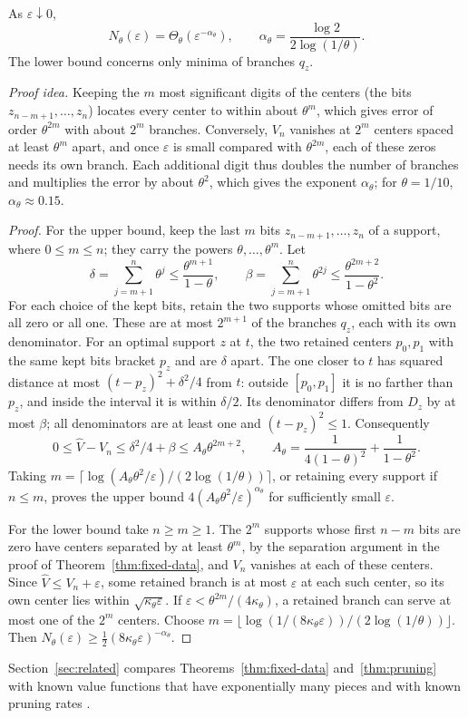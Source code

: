 \begin{theorem}\label{thm:pruning}
As $\varepsilon\downarrow0$,
\[
 N_\theta(\varepsilon)=\Theta_\theta(\varepsilon^{-\alpha_\theta}),
 \qquad \alpha_\theta=\frac{\log2}{2\log(1/\theta)}.
\]
The lower bound concerns only minima of branches $q_z$.
\end{theorem}

\emph{Proof idea.} Keeping the $m$ most significant digits of the
centers (the bits $z_{n-m+1},\ldots,z_n$) locates every center to within
about $\theta^m$, which gives error of order $\theta^{2m}$ with about
$2^m$ branches. Conversely, $V_n$ vanishes at $2^m$ centers spaced at
least $\theta^m$ apart, and once $\varepsilon$ is small compared with
$\theta^{2m}$, each of these zeros needs its own branch. Each additional
digit thus doubles the number of branches and multiplies the error by
about $\theta^2$, which gives the exponent $\alpha_\theta$; for
$\theta=1/10$, $\alpha_\theta\approx0.15$.

\begin{proof}
For the upper bound, keep the last $m$ bits $z_{n-m+1},\ldots,z_n$ of a
support, where $0\le m\le n$; they carry the powers
$\theta,\ldots,\theta^m$. Let
\[
 \delta=\sum_{j=m+1}^n\theta^j\le\frac{\theta^{m+1}}{1-\theta},
 \qquad
 \beta=\sum_{j=m+1}^n\theta^{2j}\le\frac{\theta^{2m+2}}{1-\theta^2}.
\]
For each choice of the kept bits, retain the two supports whose omitted
bits are all zero or all one. These are at most $2^{m+1}$ of the
branches $q_z$, each with its own denominator. For an optimal support
$z$ at $t$, the two retained centers $p_0,p_1$ with the same kept bits
bracket $p_z$ and are $\delta$ apart. The one closer to $t$ has
squared distance at most $(t-p_z)^2+\delta^2/4$ from $t$: outside
$[p_0,p_1]$ it is no farther than $p_z$, and inside the interval it is
within $\delta/2$. Its denominator differs from $D_z$ by at most
$\beta$; all denominators are at least one and $(t-p_z)^2\le1$.
Consequently
\begin{equation}\label{eq:pruning-upper}
 0\le\widehat V-V_n\le\delta^2/4+\beta
 \le A_\theta\theta^{2m+2},\qquad
 A_\theta=\frac1{4(1-\theta)^2}+\frac1{1-\theta^2}.
\end{equation}
Taking $m=\lceil\log(A_\theta\theta^2/\varepsilon)/
(2\log(1/\theta))\rceil$, or retaining every support if $n\le m$,
proves the upper bound $4(A_\theta\theta^2/\varepsilon)^{\alpha_\theta}$
for sufficiently small $\varepsilon$.

For the lower bound take $n\ge m\ge1$. The $2^m$ supports whose first
$n-m$ bits are zero have centers separated by at least $\theta^m$, by
the separation argument in the proof of Theorem~\ref{thm:fixed-data},
and $V_n$ vanishes at each of these centers. Since
$\widehat V\le V_n+\varepsilon$, some retained branch is at most
$\varepsilon$ at each such center, so its own center lies within
$\sqrt{\kappa_\theta\varepsilon}$. If
$\varepsilon<\theta^{2m}/(4\kappa_\theta)$, a retained branch can serve
at most one of the $2^m$ centers. Choose
$m=\lfloor\log(1/(8\kappa_\theta\varepsilon))/(2\log(1/\theta))\rfloor$.
Then $N_\theta(\varepsilon)\ge
\tfrac12(8\kappa_\theta\varepsilon)^{-\alpha_\theta}$.
\end{proof}

Section~\ref{sec:related} compares Theorems~\ref{thm:fixed-data}
and~\ref{thm:pruning} with known value functions that have
exponentially many pieces \cite{Murty,KuricTree} and with known pruning
rates \cite{GaubertPruning}.
